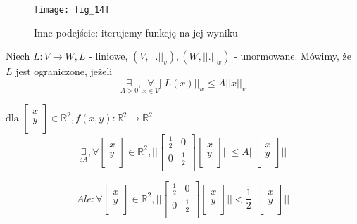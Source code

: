 \documentclass[../main.tex]{subfiles}
\begin{document}
\begin{figure}[h]
    \centering
    \texttt{[image: fig\_14]}
    \caption{Inne podejście: iterujemy funkcję na jej wyniku}
\end{figure}

\begin{definicja}
    Niech $L: V\to W, L$ - liniowe, $(V,||.||_v),(W,||.||_w)$ - unormowane.
    Mówimy, że $L$ jest ograniczone, jeżeli
$$\underset{A>0}{\exists},\underset{x\in V}{\forall} ||L(x)||_w \leq A||x||_v$$
\end{definicja}

\begin{przyklad}

\end{przyklad}

$\text{dla }
\left [ \begin{matrix}
x\\
y\\
 \end{matrix}\right ] \in \mathbb{R}^2, f(x,y) : \mathbb{R}^2 \to \mathbb{R}^2$\\
$$\underset{?A}{\exists}, \forall
\left [ \begin{matrix}
x\\
y\\
 \end{matrix}\right ] \in \mathbb{R}^2, \Bigg | \Bigg | \left [ \begin{matrix}
\frac{1}{2} &0\\
0 &\frac{1}{2}\\
 \end{matrix}\right ]
\left [ \begin{matrix}
x\\
y\\ \end{matrix}\right ] \Bigg | \Bigg |
\leq A \Bigg | \Bigg | \left [ \begin{matrix}
x\\
y\\ \end{matrix}\right ]
\Bigg | \Bigg |$$

$$Ale: \forall \left [ \begin{matrix}
x\\
y\\
 \end{matrix}\right ] \in \mathbb{R}^2, \Bigg | \Bigg |
\left [ \begin{matrix}
\frac{1}{2} &0\\
0 & \frac{1}{2}\\
 \end{matrix}\right ]
\left [ \begin{matrix} x\\
y\\ \end{matrix}\right ]
\Bigg | \Bigg | < \frac{1}{2} \Bigg | \Bigg |  \left [ \begin{matrix}
x\\
y\\ \end{matrix}\right ] \Bigg | \Bigg|
$$
\end{document}
